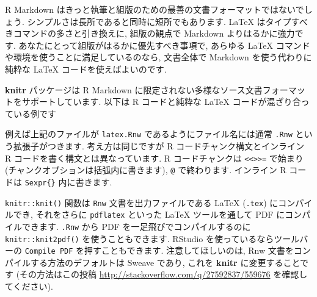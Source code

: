\documentclass[
  11pt,
  lualatex,
  ja=standard]{bxjsreport}
\newenvironment{Shaded}{\begin{snugshade}}{\end{snugshade}}
\newcommand{\BuiltInTok}[1]{#1}
\newcommand{\ExtensionTok}[1]{#1}
\newcommand{\FunctionTok}[1]{\textcolor[rgb]{0.00,0.00,0.00}{#1}}
\newcommand{\KeywordTok}[1]{\textcolor[rgb]{0.13,0.29,0.53}{\textbf{#1}}}
\newcommand{\NormalTok}[1]{#1}
\newcommand{\SpecialCharTok}[1]{\textcolor[rgb]{0.00,0.00,0.00}{#1}}
\newcommand{\SpecialStringTok}[1]{\textcolor[rgb]{0.31,0.60,0.02}{#1}}
\begin{document}
R Markdown はきっと執筆と組版のための最善の文書フォーマットではないでしょう. シンプルさは長所であると同時に短所でもあります. LaTeX はタイプすべきコマンドの多さと引き換えに, 組版の観点で Markdown よりはるかに強力です. あなたにとって組版がはるかに優先すべき事項で, あらゆる LaTeX コマンドや環境を使うことに満足しているのなら, 文書全体で Markdown を使う代わりに純粋な LaTeX コードを使えばよいのです.

\textbf{knitr} パッケージは R Markdown に限定されない多様なソース文書フォーマットをサポートしています. 以下は R コードと純粋な LaTeX コードが混ざり合っている例です

\begin{Shaded}
\end{Shaded}

例えば上記のファイルが \texttt{latex.Rnw} であるようにファイル名には通常 \texttt{.Rnw} という拡張子がつきます. 考え方は同じですが R コードチャンク構文とインライン R コードを書く構文とは異なっています. R コードチャンクは \texttt{\textless{}\textless{}\textgreater{}\textgreater{}=} で始まり (チャンクオプションは括弧内に書きます), \texttt{@} で終わります. インライン R コードは \texttt{Sexpr\{\}} 内に書きます.

\texttt{knitr::knit()} 関数は \texttt{Rnw} 文書を出力ファイルである LaTeX (\texttt{.tex}) にコンパイルでき, それをさらに \texttt{pdflatex} といった LaTeX ツールを通して PDF にコンパイルできます. \texttt{.Rnw} から PDF を一足飛びでコンパイルするのに \texttt{knitr::knit2pdf()} を使うこともできます. RStudio を使っているならツールバーの \texttt{Compile PDF} を押すこともできます. 注意してほしいのは, Rnw 文書をコンパイルする方法のデフォルトは Sweave であり, これを \textbf{knitr} に変更することです (その方法はこの投稿 \url{http://stackoverflow.com/q/27592837/559676} を確認してください).
\end{document}
